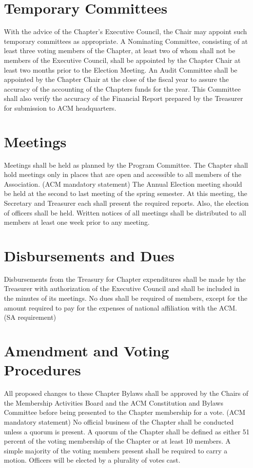 \documentclass{article}
\begin{document}
\section{Temporary Committees}
With the advice of the Chapter’s Executive Council, the Chair may appoint such temporary committees as appropriate.
A Nominating Committee, consisting of at least three voting members of the Chapter, at least two of whom shall not be members of the Executive Council, shall be appointed by the Chapter Chair at least two months prior to the Election Meeting.
An Audit Committee shall be appointed by the Chapter Chair at the close of the fiscal year to assure the accuracy of the accounting of the Chapters funds for the year. This Committee shall also verify the accuracy of the Financial Report prepared by the Treasurer for submission to ACM headquarters.

\section{Meetings}
Meetings shall be held as planned by the Program Committee. The Chapter shall hold meetings only in places that are open and accessible to all members of the Association. (ACM mandatory statement)
The Annual Election meeting should be held at the second to last meeting of the spring semester. At this meeting, the Secretary and Treasurer each shall present the required reports. Also, the election of officers shall be held.
Written notices of all meetings shall be distributed to all members at least one week prior to any meeting.

\section{Disbursements and Dues}
Disbursements from the Treasury for Chapter expenditures shall be made by the Treasurer with authorization of the Executive Council and shall be included in the minutes of its meetings.
No dues shall be required of members, except for the amount required to pay for the expenses of national affiliation with the ACM. (SA requirement)

\section{Amendment and Voting Procedures}
All proposed changes to these Chapter Bylaws shall be approved by the Chairs of the Membership Activities Board and the ACM Constitution and Bylaws Committee before being presented to the Chapter membership for a vote. (ACM mandatory statement)
No official business of the Chapter shall be conducted unless a quorum is present. A quorum of the Chapter shall be defined as either 51 percent of the voting membership of the Chapter or at least 10 members.
A simple majority of the voting members present shall be required to carry a motion.
Officers will be elected by a plurality of votes cast.
\end{document}
